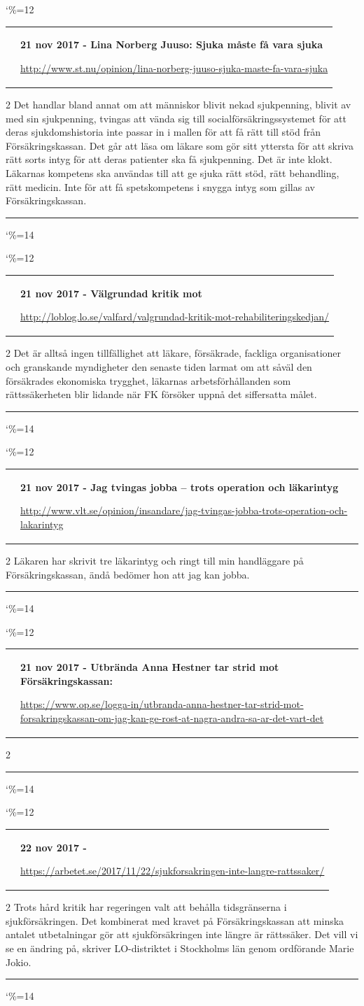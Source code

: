 \documentclass[a4paper]{article}
\makeatletter
\newcommand{\entry}{
\catcode`\%=12
\@entry}
\newcommand{\@entry}[4][]{
\bigskip
\begin{tabular*}{\textwidth}{l m{\textwidth-4cm}}
\qrcode{#4} & \textbf{#2}

\medskip

\url{#4}

\end{tabular*}

\medskip


\begin{multicols}{2}
#3
\end{multicols}

#1

\medskip
\hrule

\catcode`\%=14
}
\makeatother
\begin{document}
{{{{{\entry{21 nov 2017 - Lina Norberg Juuso: Sjuka måste få vara sjuka}{Det handlar bland annat om att människor blivit nekad sjukpenning, blivit av med sin sjukpenning, tvingas att vända sig till socialförsäkringssystemet för att deras sjukdomshistoria inte passar in i mallen för att få rätt till stöd från Försäkringskassan. Det går att läsa om läkare som gör sitt yttersta för att skriva rätt sorts intyg för att deras patienter ska få sjukpenning. Det är inte klokt. Läkarnas kompetens ska användas till att ge sjuka rätt stöd, rätt behandling, rätt medicin. Inte för att få spetskompetens i snygga intyg som gillas av Försäkringskassan.}{http://www.st.nu/opinion/lina-norberg-juuso-sjuka-maste-fa-vara-sjuka}

\entry{21 nov 2017 - Välgrundad kritik mot \say{rehabiliteringskedjan}}{Det är alltså ingen tillfällighet att läkare, försäkrade, fackliga organisationer och granskande myndigheter den senaste tiden larmat om att såväl den försäkrades ekonomiska trygghet, läkarnas arbetsförhållanden som rättssäkerheten blir lidande när FK försöker uppnå det siffersatta målet.}{http://loblog.lo.se/valfard/valgrundad-kritik-mot-rehabiliteringskedjan/}

\entry{21 nov 2017 - Jag tvingas jobba – trots operation och läkarintyg}{Läkaren har skrivit tre läkarintyg och ringt till min handläggare på Försäkringskassan, ändå bedömer hon att jag kan jobba.}{http://www.vlt.se/opinion/insandare/jag-tvingas-jobba-trots-operation-och-lakarintyg}


\entry{21 nov 2017 - Utbrända Anna Hestner tar strid mot Försäkringskassan: \say{Om jag kan ge röst åt några andra så är det värt det}}{}{https://www.op.se/logga-in/utbranda-anna-hestner-tar-strid-mot-forsakringskassan-om-jag-kan-ge-rost-at-nagra-andra-sa-ar-det-vart-det}


\entry{22 nov 2017 - \say{Sjukförsäkringen inte längre rättssäker}}{Trots hård kritik har regeringen valt att behålla tidsgränserna i sjukförsäkringen. Det kombinerat med kravet på Försäkringskassan att minska antalet utbetalningar gör att sjukförsäkringen inte längre är rättssäker. Det vill vi se en ändring på, skriver LO-distriktet i Stockholms län genom ordförande Marie Jokio.}{https://arbetet.se/2017/11/22/sjukforsakringen-inte-langre-rattssaker/}

}}}}}
\end{document}
